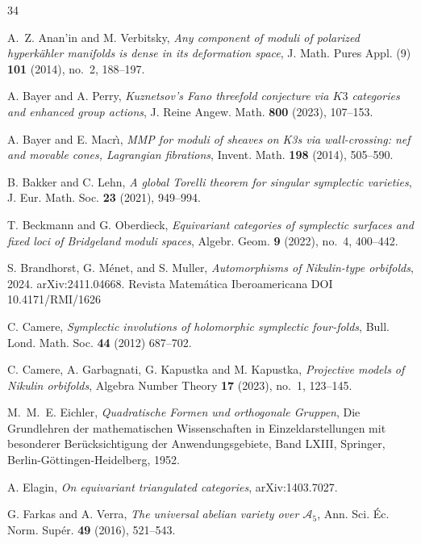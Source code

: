\documentclass{amsart}
\theoremstyle{definition}
\numberwithin{equation}{section}
\numberwithin{equation}{section} \theoremstyle{definition}
\begin{document}
\begin{thebibliography}{34}

 A.~Z. Anan'in and M. Verbitsky,
  \emph{Any component of moduli of polarized hyperk\"ahler manifolds is dense
  in its deformation space}, J. Math. Pures Appl. (9) {\bf 101} (2014),
  no.~2, 188--197.

 A. Bayer and A. Perry,
  \emph{Kuznetsov's Fano threefold conjecture via $K3$ categories and enhanced
  group actions}, J. Reine Angew. Math. {\bf 800} (2023), 107--153.

 A. Bayer and E. Macr\`\i,
  \emph{MMP for moduli of sheaves on K3s via wall-crossing: nef and movable
  cones, Lagrangian fibrations}, Invent. Math. {\bf 198} (2014), 505--590.



 B. Bakker and C. Lehn,
  \emph{A global Torelli theorem for singular symplectic varieties},
  J. Eur. Math. Soc. {\bf 23} (2021), 949--994.

 T. Beckmann and G. Oberdieck,
  \emph{Equivariant categories of symplectic surfaces and fixed loci of
  Bridgeland moduli spaces}, Algebr. Geom. {\bf 9} (2022), no.~4, 400--442.

 S. Brandhorst, G. M\'enet, and S. Muller,
  \emph{Automorphisms of Nikulin-type orbifolds}, 2024. arXiv:2411.04668. Revista Matemática Iberoamericana DOI
10.4171/RMI/1626

 C. Camere, \emph{Symplectic involutions of holomorphic symplectic four-folds}, Bull. Lond. Math.
Soc. {\bf 44} (2012) 687--702.

 C. Camere, A. Garbagnati, G. Kapustka and M. Kapustka, 
  \emph{Projective models of Nikulin orbifolds}, Algebra Number Theory {\bf 17}
  (2023), no.~1, 123--145. %

 M.~M.~E. Eichler, {\it Quadratische Formen und orthogonale Gruppen}, Die Grundlehren der mathematischen Wissenschaften in Einzeldarstellungen mit besonderer Ber\"ucksichtigung der Anwendungsgebiete, Band LXIII, Springer, Berlin-G\"ottingen-Heidelberg, 1952.

 A. Elagin,
  \emph{On equivariant triangulated categories}, arXiv:1403.7027.

 G. Farkas and A. Verra,
  \emph{The universal abelian variety over $\mathcal{A}_5$},
  Ann. Sci. \'Ec. Norm. Sup\'er. {\bf 49} (2016), 521--543.


\end{thebibliography}
\end{document}

